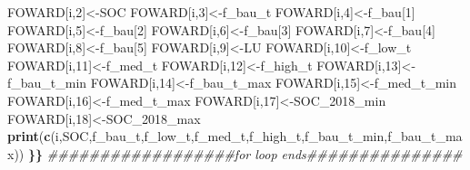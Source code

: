 \documentclass[
  10pt,
  b5paper,
]{book}
\newenvironment{Shaded}{\begin{snugshade}}{\end{snugshade}}
\newcommand{\CommentTok}[1]{\textcolor[rgb]{0.56,0.35,0.01}{\textit{#1}}}
\newcommand{\DecValTok}[1]{\textcolor[rgb]{0.00,0.00,0.81}{#1}}
\newcommand{\ErrorTok}[1]{\textcolor[rgb]{0.64,0.00,0.00}{\textbf{#1}}}
\newcommand{\KeywordTok}[1]{\textcolor[rgb]{0.13,0.29,0.53}{\textbf{#1}}}
\newcommand{\NormalTok}[1]{#1}
\begin{document}
\begin{Shaded}
\begin{Highlighting}[]
\NormalTok{FOWARD[i,}\DecValTok{2}\NormalTok{]<-SOC}
\NormalTok{FOWARD[i,}\DecValTok{3}\NormalTok{]<-f_bau_t}
\NormalTok{FOWARD[i,}\DecValTok{4}\NormalTok{]<-f_bau[}\DecValTok{1}\NormalTok{]}
\NormalTok{FOWARD[i,}\DecValTok{5}\NormalTok{]<-f_bau[}\DecValTok{2}\NormalTok{]}
\NormalTok{FOWARD[i,}\DecValTok{6}\NormalTok{]<-f_bau[}\DecValTok{3}\NormalTok{]}
\NormalTok{FOWARD[i,}\DecValTok{7}\NormalTok{]<-f_bau[}\DecValTok{4}\NormalTok{]}
\NormalTok{FOWARD[i,}\DecValTok{8}\NormalTok{]<-f_bau[}\DecValTok{5}\NormalTok{]}
\NormalTok{FOWARD[i,}\DecValTok{9}\NormalTok{]<-LU}
\NormalTok{FOWARD[i,}\DecValTok{10}\NormalTok{]<-f_low_t}
\NormalTok{FOWARD[i,}\DecValTok{11}\NormalTok{]<-f_med_t}
\NormalTok{FOWARD[i,}\DecValTok{12}\NormalTok{]<-f_high_t}
\NormalTok{FOWARD[i,}\DecValTok{13}\NormalTok{]<-f_bau_t_min}
\NormalTok{FOWARD[i,}\DecValTok{14}\NormalTok{]<-f_bau_t_max}
\NormalTok{FOWARD[i,}\DecValTok{15}\NormalTok{]<-f_med_t_min}
\NormalTok{FOWARD[i,}\DecValTok{16}\NormalTok{]<-f_med_t_max}
\NormalTok{FOWARD[i,}\DecValTok{17}\NormalTok{]<-SOC_}\DecValTok{2018}\NormalTok{_min}
\NormalTok{FOWARD[i,}\DecValTok{18}\NormalTok{]<-SOC_}\DecValTok{2018}\NormalTok{_max}
\KeywordTok{print}\NormalTok{(}\KeywordTok{c}\NormalTok{(i,SOC,f_bau_t,f_low_t,f_med_t,f_high_t,f_bau_t_min,f_bau_t_max))}
\ErrorTok{\}\}}
\CommentTok{##################for loop ends###############}
\end{Highlighting}
\end{Shaded}
\end{document}
